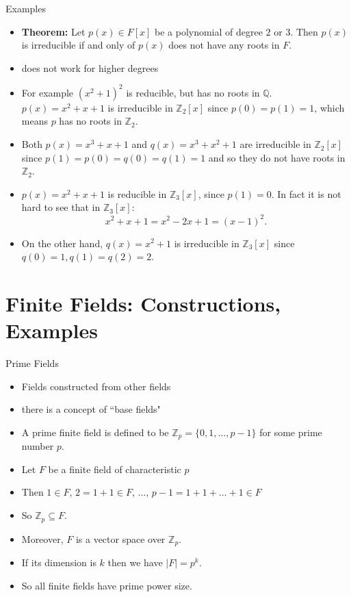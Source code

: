 \documentclass[ %
 10pt, xcolor={dvipsnames,svgnames,x11names,hyperref},
   hyperref={colorlinks=true,citecolor=green,linkcolor=DarkRed,urlcolor=ProcessBlue,anchorcolor=blue}
  ]{beamer}
\newenvironment{stepitemize}{\begin{itemize}[<+->]}{\end{itemize} }
\newcommand{\Z}{\mathbb{Z}}
\newcommand{\Q}{\mathbb{Q}}
\begin{document}
\begin{frame}{Examples}
\begin{stepitemize}
    \item {\bf Theorem:} Let $p(x)\in F[x]$ be a polynomial of degree $2$ or $3$. Then $p(x)$ is irreducible if and only of $p(x)$ does not have any roots in $F$.
\item does not work for higher degrees
\item For example $(x^2+1)^2$ is reducible, but has no roots in $\Q$.
$p(x)=x^2+x+1$ is irreducible in $\Z_2[x]$ since $p(0)=p(1)=1$, which means $p$ has no roots in $\Z_2$.
    \item Both $p(x)=x^3+x+1$ and $q(x)=x^3+x^2+1$ are irreducible in $\Z_2[x]$ since $p(1)=p(0)=q(0)=q(1)=1$ and so they do not have roots in $\Z_2$.
    \item $p(x)=x^2+x+1$ is reducible in $\Z_3[x]$, since $p(1)=0$. In fact it is not hard to see that in $\Z_3[x]$:
    $$x^2+x+1 = x^2-2x+1 = (x-1)^2.$$
    \item On the other hand, $q(x)=x^2+1$ is irreducible in $\Z_3[x]$ since $q(0)=1, q(1)=q(2)=2$.
\end{stepitemize}
\end{frame}

\section{Finite Fields: Constructions, Examples}
\begin{frame}{Prime Fields}
\begin{stepitemize}
    \item Fields constructed from other fields
    \item there is a concept of ``base fields"
    \item A prime finite field is defined to be $\Z_p = \{0, 1,\dots, p-1\}$ for some prime number $p$.
    \item Let $F$ be a finite field of characteristic $p$
    \item Then $1\in F$, $2=1+1\in F$, $\dots$, $p-1=1+1+\dots +1 \in F$
    \item So $\Z_p\subseteq F$.
    \item Moreover, $F$ is a vector space over $\Z_p$.
    \item If its dimension is $k$ then we have $|F| = p^k$.
    \item So all finite fields have prime power size.
\end{stepitemize}
\end{frame}
\end{document}
